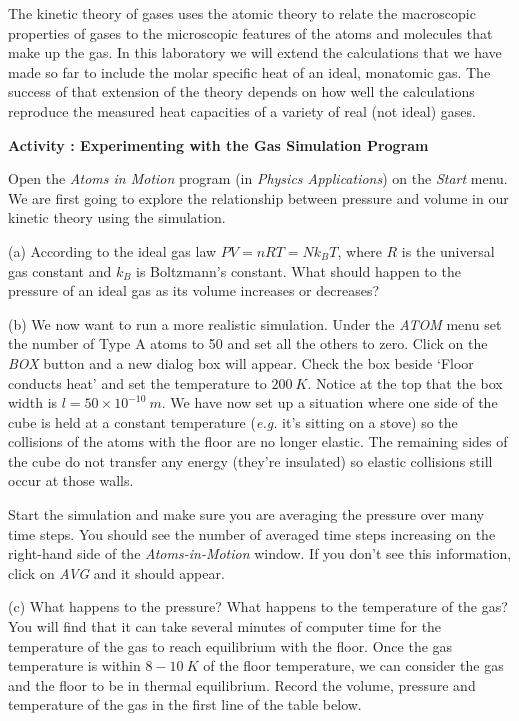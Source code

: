 The kinetic theory of gases uses the atomic theory to relate the macroscopic
properties of gases to the microscopic features of the atoms and molecules
that make up the gas. In this laboratory we will extend the calculations
that we have made so far to include the molar specific heat of an
ideal, monatomic gas. The success of that extension of the theory
depends on how well the calculations reproduce the measured heat capacities
of a variety of real (not ideal) gases.

\textbf{Activity : Experimenting with the Gas Simulation Program}

Open the {\it Atoms in Motion} program (in {\it Physics Applications}) on the {\it Start} menu.
We are first going to explore the relationship between pressure and volume in
our kinetic theory using the simulation. 

(a) According to the ideal gas law \( PV = nRT = Nk_{B}T \), where \( R \) is the 
universal gas constant and \( k_{B} \) is Boltzmann's constant. What
should happen to the pressure of an ideal gas as its volume increases
or decreases?
\vspace{1.0in}

(b) We now want to run a more realistic simulation.
Under the {\it ATOM} menu set the number of Type A atoms to 50 and set all the others to zero.
Click on the {\it BOX} button and a new dialog box will appear.
Check the box beside `Floor conducts heat' and set the temperature to $200~K$.
Notice at the top that the box width is $l=50 \times 10^{-10}~m$.
We have now set up a situation where one side of the cube is held at a constant
temperature ({\it e.g.} it's sitting on a stove) so the collisions of the atoms with the
floor are no longer elastic.
The remaining sides of the
cube do not transfer any energy (they're insulated) so elastic collisions still occur 
at those walls.

Start
the simulation and make sure you are averaging the pressure over many time steps.
You should see the number of averaged time steps increasing on the right-hand side 
of the {\it Atoms-in-Motion} window. 
If you don't see this information, click on {\it AVG} and it should appear.

(c) What happens to the pressure?
What happens to the temperature of the gas? 
You will find that it can take several minutes of computer time for the temperature 
of the gas to reach equilibrium with the floor.
Once the gas temperature is within $8-10~K$ of the floor temperature, 
we can consider the gas and the floor to be in thermal equilibrium. 
Record the volume, pressure and temperature of the gas in the first line of the table below.
\vspace{20mm}

